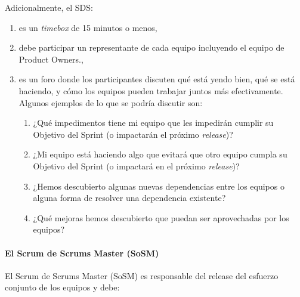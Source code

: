 \documentclass{article} %
\begin{document}
\noindent 

\noindent Adicionalmente, el SDS:

\noindent 

\begin{enumerate}
\item  es un \textit{timebox }de 15 minutos o menos,

\item  debe participar un representante de cada equipo incluyendo el equipo de Product Owners.,

\item  es un foro donde los participantes discuten qu\'{e} est\'{a} yendo bien, qu\'{e} se est\'{a} haciendo, y c\'{o}mo los equipos pueden trabajar juntos m\'{a}s efectivamente. Algunos ejemplos de lo que se podr\'{i}a discutir son:

\begin{enumerate}
\item  ¿Qu\'{e} impedimentos tiene mi equipo que les impedir\'{a}n cumplir su Objetivo del Sprint (o impactar\'{a}n el pr\'{o}ximo \textit{release})?

\item  ¿Mi equipo est\'{a} haciendo algo que evitar\'{a} que otro equipo cumpla su Objetivo del Sprint (o impactar\'{a} en el pr\'{o}ximo \textit{release})?

\item  ¿Hemos descubierto algunas nuevas dependencias entre los equipos o alguna forma de resolver una dependencia existente?

\item  ¿Qu\'{e} mejoras hemos descubierto que puedan ser aprovechadas por los equipos?
\end{enumerate}
\end{enumerate}

\noindent 
\paragraph{El Scrum de Scrums Master (SoSM)}

\noindent 

\noindent El Scrum de Scrums Master (SoSM) es responsable del release del esfuerzo conjunto de los equipos y debe:
\end{document}
